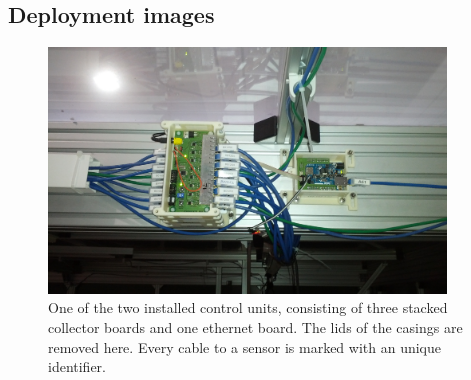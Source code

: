 \documentclass[a4paper]{scrreprt}
\begin{document}
\begin{appendices}
\chapter{Deployment images}
\begin{figure}[Hh!]
	\centering
	\includegraphics[width=0.94\textwidth]{img/control_unit.jpg}
	\caption{One of the two installed control units, consisting of three stacked collector boards and one ethernet board. The lids of the casings are removed here. Every cable to a sensor is marked with an unique identifier.}
	\label{fig:control_unit} 
\end{figure}
\end{appendices}
\end{document}
